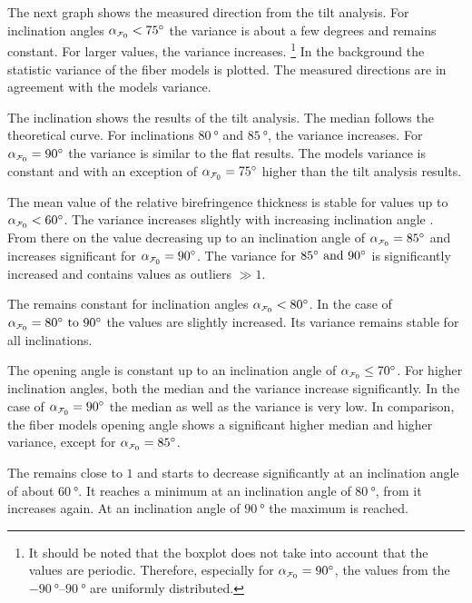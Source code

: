 %
The next graph shows the measured direction from the tilt analysis.
For inclination angles $\modelInc<\SI{75}{\degree}$ the variance is about a few degrees and remains constant.
For larger values, the variance increases.
\footnote{It should be noted that the boxplot does not take into account that the values are periodic.
Therefore, especially for $\modelInc=\SI{90}{\degree}$, the values from the $\SIrange{-90}{90}{\degree}$ are uniformly distributed.}
In the background the statistic \bvariance{} variance of the fiber models is plotted.
The measured directions are in agreement with the models variance.
\par
%
The inclination shows the results of the tilt analysis.
The median follows the theoretical curve.
For inclinations $\SI{80}{\degree}$ and $\SI{85}{\degree}$, the variance increases.
For $\modelInc = \SI{90}{\degree}$ the variance is similar to the flat results.
The models \bvariance{} variance is constant and with an exception of $\modelInc=\SI{75}{\degree}$ higher than the tilt analysis results.
\par
%
The mean value of the relative birefringence thickness \trel{} is stable for values up to $\modelInc < \SI{60}{\degree}$.
The variance increases slightly with increasing inclination angle \modelInc{}.
From there on the \trel{} value decreasing up to an inclination angle of $\modelInc=\SI{85}{\degree}$ and increases significant for $\modelInc = \SI{90}{\degree}$.
The variance for $\SIlist{85;90}{\degree}$ is significantly increased and contains values as outliers $\gg 1$.
\par
%
The \rvalue{} remains constant for inclination angles $\modelInc < \SI{80}{\degree}$.
In the case of $\modelInc=\SIrange[]{80}{90}{\degree}$ the values are slightly increased.
Its variance remains stable for all inclinations.
\par
%
The opening angle \openingAngle{} is constant up to an inclination angle of $\modelInc \le \SI{70}{\degree}$.
For higher inclination angles, both the median and the variance increase significantly.
In the case of $\modelInc = \SI{90}{\degree}$ the median as well as the variance is very low.
In comparison, the fiber models opening angle \openingAngle{} shows a significant higher median and higher \bvariance{} variance, except for $\modelInc=\SI{85}{\degree}$.
\par
%
The \accvalue{} remains close to $1$ and starts to decrease significantly at an inclination angle of about $\SI{60}{\degree}$.
It reaches a minimum at an inclination angle of $\SI{80}{\degree}$, from it increases again.
At an inclination angle of $\SI{90}{\degree}$ the maximum \accvalue{} is reached.
%
%
%
